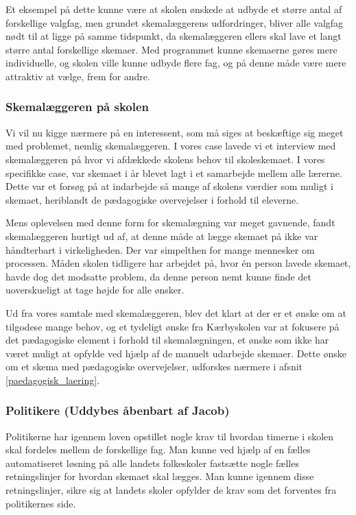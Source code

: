 Et eksempel på dette kunne være at skolen ønskede at udbyde et større antal af forskellige valgfag, men grundet skemalæggerens udfordringer, bliver alle valgfag nødt til at ligge på samme tidspunkt, da skemalæggeren ellers skal lave et langt større antal forskellige skemaer. Med programmet kunne skemaerne gøres mere individuelle, og skolen ville kunne udbyde flere fag, og på denne måde være mere attraktiv at vælge, frem for andre.

\subsubsection{Skemalæggeren på skolen}
Vi vil nu kigge nærmere på en interessent, som må siges at beskæftige sig meget med problemet, nemlig skemalæggeren. I vores case lavede vi et interview med skemalæggeren på \school hvor vi afdækkede skolens behov til skoleskemaet. I vores specifikke case, var skemaet i år blevet lagt i et samarbejde mellem alle lærerne. Dette var et forsøg på at indarbejde så mange af skolens værdier som muligt i skemaet, heriblandt de pædagogiske overvejelser i forhold til eleverne.

Mens oplevelsen med denne form for skemalægning var meget gavnende, fandt skemalæggeren hurtigt ud af, at denne måde at lægge skemaet på ikke var håndterbart i virkeligheden. Der var simpelthen for mange mennesker om processen. Måden skolen tidligere har arbejdet på, hvor \'en person lavede skemaet, havde dog det modsatte problem, da denne person nemt kunne finde det uoverskueligt at tage højde for alle ønsker.

Ud fra vores samtale med skemalæggeren, blev det klart at der er et ønske om at tilgodese mange behov, og et tydeligt ønske fra Kærbyskolen var at fokusere på det pædagogiske element i forhold til skemalægningen, et ønske som ikke har været muligt at opfylde ved hjælp af de manuelt udarbejde skemaer. Dette ønske om et skema med pædagogiske overvejelser, udforskes nærmere i afsnit \ref{paedagogisk_laering}.

\subsubsection{Politikere (Uddybes åbenbart af Jacob)}
Politikerne har igennem loven opstillet nogle krav til hvordan timerne i skolen skal fordeles mellem de forskellige fag. Man kunne ved hjælp af en fælles automatiseret løsning på alle landets folkeskoler fastsætte nogle fælles retningslinjer for hvordan skemaet skal lægges. Man kunne igennem disse retningslinjer, sikre sig at landets skoler opfylder de krav som det forventes fra politikernes side. 

